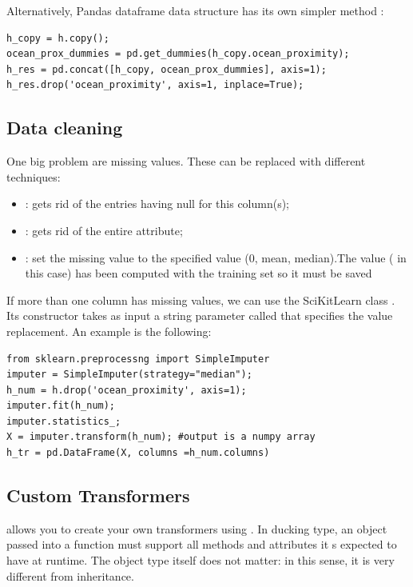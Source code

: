 Alternatively, Pandas dataframe data structure has its own simpler method :
\begin{lstlisting}[caption=Usage of \ti{pd.get\_dummies()}]
h_copy = h.copy();
ocean_prox_dummies = pd.get_dummies(h_copy.ocean_proximity);
h_res = pd.concat([h_copy, ocean_prox_dummies], axis=1);
h_res.drop('ocean_proximity', axis=1, inplace=True);
\end{lstlisting}

\subsection{Data cleaning}
One big problem are missing values. These can be replaced with different techniques:
\begin{itemize}
\item {}: gets rid of the entries having null for this column(s);
\item {}: gets rid of the entire attribute;
\item {}: set the missing value to the specified value (0, mean, median).The value ( in this case) has been computed with the training set so it must be saved
\end{itemize}

If more than one column has missing values, we can use the SciKitLearn class . Its constructor takes as input a string parameter called  that specifies the value replacement. An example is the following:
\begin{lstlisting}[caption=Usage of \ti{SimpleImputer to clean data}]
from sklearn.preprocessng import SimpleImputer
imputer = SimpleImputer(strategy="median");
h_num = h.drop('ocean_proximity', axis=1);
imputer.fit(h_num);
imputer.statistics_;
X = imputer.transform(h_num); #output is a numpy array
h_tr = pd.DataFrame(X, columns =h_num.columns)
\end{lstlisting}

\subsection{Custom Transformers}
 allows you to create your own transformers using . In ducking type, an object passed into a function must support all methods and attributes it s expected to have at runtime. The object type itself does not matter: in this sense, it is very different from inheritance. 


